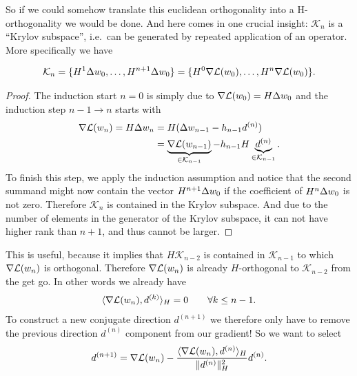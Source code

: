So if we could somehow translate this euclidean orthogonality into a
H-orthogonality we would be done. And here comes in one crucial insight:
\(\mathcal{K}_n\) is a ``Krylov subspace'', i.e.\ can be generated by repeated
application of an operator. More specifically we have
\begin{lemma}
	\begin{align*}
		\mathcal{K}_n
		= \{H^1 \Delta w_0, \dots, H^{n+1}\Delta w_0\}
		= \{H^0 \nabla\mathcal{L}(w_0), \dots, H^n\nabla\mathcal{L}(w_0)\}.
	\end{align*}
\end{lemma}
\begin{proof}
	The induction start \(n=0\) is simply due to \(\nabla\mathcal{L}(w_0) =
	H\Delta w_0\) and the induction step \(n-1\to n\) starts with
	\begin{align}
		\nonumber
		\nabla\mathcal{L}(w_n)= H\Delta w_n
		&= H(\Delta w_{n-1} - h_{n-1} d^{(n)})\\
		\label{eq: represent nabla Loss(weights_n) with prev gradient and d(n)}
		&= \underbrace{\nabla\mathcal{L}(w_{n-1})}_{\in \mathcal{K}_{n-1}} - h_{n-1} H
		\underbrace{d^{(n)}}_{\in \mathcal{K}_{n-1}}.
	\end{align}
	To finish this step, we apply the induction assumption and notice that the
	second summand might now contain the vector \(H^{n+1}\Delta w_0\) if the
	coefficient of \(H^{n}\Delta w_0\) is not zero. Therefore
	\(\mathcal{K}_{n}\) is contained in the Krylov subspace. And due to the
	number of elements in the generator of the Krylov subspace, it can not have
	higher rank than \(n+1\), and thus cannot be larger.
\end{proof}
This is useful, because it implies that \(H\mathcal{K}_{n-2}\) is contained
in \(\mathcal{K}_{n-1}\) to which \(\nabla\mathcal{L}(w_n)\) is orthogonal.
Therefore \(\nabla\mathcal{L}(w_n)\) is already \(H\)-orthogonal to
\(\mathcal{K}_{n-2}\) from the get go. In other words we already have
\begin{align*}
	\langle \nabla\mathcal{L}(w_n), d^{(k)} \rangle_H = 0 
	\qquad \forall k\le n-1.
\end{align*}
To construct a new conjugate direction \(d^{(n+1)}\) we therefore only have to
remove the previous direction \(d^{(n)}\) component from our gradient! So we
want to select
\begin{align}\label{eq: next search direction}
	d^{(n+1)} = \nabla\mathcal{L}(w_n)
	- \frac{\langle \nabla\mathcal{L}(w_n), d^{(n)}\rangle_H}{\|d^{(n)}\|_H^2}d^{(n)}.
\end{align}

